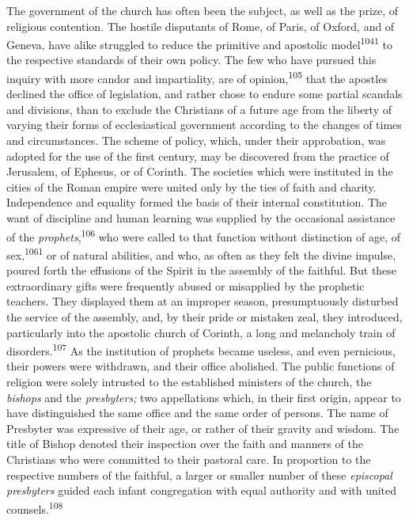 The government of the church has often been the subject, as well
as the prize, of religious contention. The hostile disputants of
Rome, of Paris, of Oxford, and of Geneva, have alike struggled to
reduce the primitive and apostolic model\textsuperscript{1041} to the respective
standards of their own policy. The few who have pursued this
inquiry with more candor and impartiality, are of opinion,\textsuperscript{105}
that the apostles declined the office of legislation, and rather
chose to endure some partial scandals and divisions, than to
exclude the Christians of a future age from the liberty of
varying their forms of ecclesiastical government according to the
changes of times and circumstances. The scheme of policy, which,
under their approbation, was adopted for the use of the first
century, may be discovered from the practice of Jerusalem, of
Ephesus, or of Corinth. The societies which were instituted in
the cities of the Roman empire were united only by the ties of
faith and charity. Independence and equality formed the basis of
their internal constitution. The want of discipline and human
learning was supplied by the occasional assistance of the
\textit{prophets},\textsuperscript{106} who were called to that function without
distinction of age, of sex,\textsuperscript{1061} or of natural abilities, and
who, as often as they felt the divine impulse, poured forth the
effusions of the Spirit in the assembly of the faithful. But
these extraordinary gifts were frequently abused or misapplied by
the prophetic teachers. They displayed them at an improper
season, presumptuously disturbed the service of the assembly,
and, by their pride or mistaken zeal, they introduced,
particularly into the apostolic church of Corinth, a long and
melancholy train of disorders.\textsuperscript{107} As the institution of prophets
became useless, and even pernicious, their powers were withdrawn,
and their office abolished. The public functions of religion were
solely intrusted to the established ministers of the church, the
\textit{bishops} and the \textit{presbyters;} two appellations which, in their
first origin, appear to have distinguished the same office and
the same order of persons. The name of Presbyter was expressive
of their age, or rather of their gravity and wisdom. The title of
Bishop denoted their inspection over the faith and manners of the
Christians who were committed to their pastoral care. In
proportion to the respective numbers of the faithful, a larger or
smaller number of these \textit{episcopal presbyters} guided each infant
congregation with equal authority and with united counsels.\textsuperscript{108}

